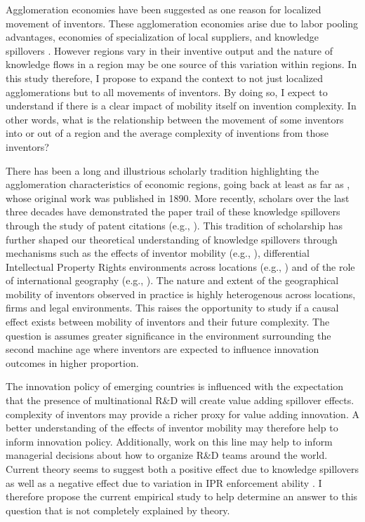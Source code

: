 \documentclass[12pt]{article}
\begin{document}
Agglomeration economies have been suggested as one reason for localized movement of inventors. These agglomeration economies arise due to labor pooling advantages, economies of specialization of local suppliers, and knowledge spillovers \citep{Porter1990, Krugman1991}. However regions vary in their inventive output \citep{Agrawal2014} and the nature of knowledge flows in a region may be one source of this variation within regions. In this study therefore, I propose to expand the context to not just localized agglomerations but to all movements of inventors. By doing so, I expect to understand if there is a clear impact of mobility itself on invention complexity. In other words, what is the relationship between the movement of some inventors into or out of a region and the average complexity of inventions from those inventors?\par

There has been a long and illustrious scholarly tradition highlighting the agglomeration characteristics of economic regions, going back at least as far as \cite{Marshall1890}, whose original work was published in 1890. More recently, scholars over the last three decades have demonstrated the paper trail of these knowledge spillovers through the study of patent citations (e.g., \cite{Jaffe1993, Almeida1999}). This tradition of scholarship has further shaped our theoretical understanding of knowledge spillovers through mechanisms such as the effects of inventor mobility (e.g., \cite{Almeida1999}), differential Intellectual Property Rights environments across locations (e.g., \cite{Zhao2006}) and of the role of international geography (e.g., \cite{Singh2007}).  The nature and extent of the geographical mobility of inventors  observed  in practice is highly heterogenous across locations, firms and legal environments. This raises the opportunity to study if  a causal effect exists between mobility of inventors and their future complexity. The question is assumes greater significance in the environment surrounding the second machine age \citep{Mcafee2014} where inventors are expected to influence innovation outcomes in higher proportion. 

The innovation policy of emerging countries is influenced with the expectation that the presence of multinational R\&D will create value adding spillover effects. complexity of inventors may  provide a richer proxy for value adding innovation. A better understanding of the effects of inventor mobility may therefore help to inform innovation policy. Additionally, work on this line may help to inform managerial decisions about how to organize R\&D teams around the world. Current theory seems to suggest both a positive effect due to knowledge spillovers \citep{Almeida1999} as well as a negative effect due to variation in IPR enforcement ability \citep{Zhao2006}. I therefore propose  the current empirical study to help determine an  answer to this question that is not completely explained by theory.
\end{document}
